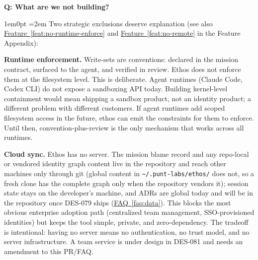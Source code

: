 \documentclass[11pt,letterpaper]{article}
\newcounter{faqnum}
\newenvironment{faqpair}[1]{%
  \needspace{4\baselineskip}%
  \vspace{0.5em}%
  \refstepcounter{faqnum}%
  \noindent\textbf{\color{SectionBlue}Q\thefaqnum: #1}\par\nopagebreak[4]%
  \vspace{0.2em}%
  \begin{adjustwidth}{1em}{0pt}%
  \setlength{\parindent}{0pt}%
  \emergencystretch=2em%
}{%
  \end{adjustwidth}%
  \vspace{0.5em}%
}
\newcommand{\faqref}[1]{\hyperref[#1]{FAQ~\ref*{#1}}}
\newcommand{\featureref}[1]{\hyperref[#1]{Feature~\ref*{#1}}}
\begin{document}
\begin{faqpair}{What are we not building?}\label{faq:not-building}
Two strategic exclusions deserve explanation (see also \featureref{feat:no-runtime-enforce} and \featureref{feat:no-remote} in the Feature Appendix):

\textbf{Runtime enforcement.} Write-sets are conventions: declared in the mission contract, surfaced to the agent, and verified in review. Ethos does not enforce them at the filesystem level. This is deliberate. Agent runtimes (Claude Code, Codex CLI) do not expose a sandboxing API today. Building kernel-level containment would mean shipping a sandbox product, not an identity product; a different problem with different customers. If agent runtimes add scoped filesystem access in the future, ethos can emit the constraints for them to enforce. Until then, convention-plus-review is the only mechanism that works across all runtimes.

\textbf{Cloud sync.} Ethos has no server. The mission blame record and any repo-local or vendored identity graph content live in the repository and reach other machines only through git (global content in {\small\texttt{\textasciitilde/.punt-labs/ethos/}} does not, so a fresh clone has the complete graph only when the repository vendors it); session state stays on the developer's machine, and ADRs are global today and will be in the repository once DES-079 ships (\faqref{faq:data}). This blocks the most obvious enterprise adoption path (centralized team management, SSO-provisioned identities) but keeps the tool simple, private, and zero-dependency. The tradeoff is intentional: having no server means no authentication, no trust model, and no server infrastructure. A team service is under design in DES-081 and needs an amendment to this PR/FAQ.
\end{faqpair}
\end{document}

